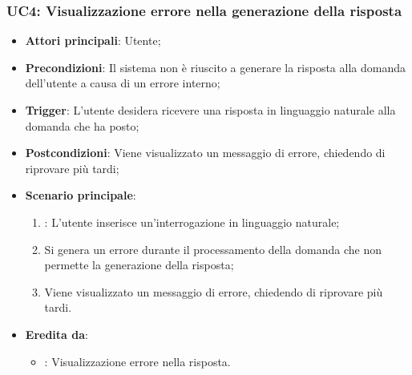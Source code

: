 \subsubsection{UC4: Visualizzazione errore nella generazione della risposta}
\begin{itemize}
    \item \textbf{Attori principali}: Utente;
    \item \textbf{Precondizioni}: Il sistema non è riuscito a generare la risposta alla domanda dell'utente a causa di un errore interno;
    \item \textbf{Trigger}: L'utente desidera ricevere una risposta in linguaggio naturale alla domanda che ha posto;
    \item \textbf{Postcondizioni}: Viene visualizzato un messaggio di errore, chiedendo di riprovare più tardi;
    \item \textbf{Scenario principale}:
    \begin{enumerate}
        \item {}: L'utente inserisce un'interrogazione in linguaggio naturale;
        \item Si genera un errore durante il processamento della domanda che non permette la generazione della risposta;
        \item Viene visualizzato un messaggio di errore, chiedendo di riprovare più tardi.
    \end{enumerate}
    \item \textbf{Eredita da}:
    \begin{itemize}
        \item {}: Visualizzazione errore nella risposta.
    \end{itemize}
\end{itemize}

\hypertarget{UC5}{}
